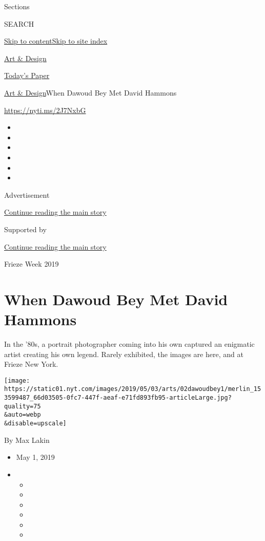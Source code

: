 Sections

SEARCH

\protect\hyperlink{site-content}{Skip to
content}\protect\hyperlink{site-index}{Skip to site index}

\href{https://www.nytimes.com/section/arts/design}{Art \& Design}

\href{https://myaccount.nytimes.com/auth/login?response_type=cookie\&client_id=vi}{}

\href{https://www.nytimes.com/section/todayspaper}{Today's Paper}

\href{/section/arts/design}{Art \& Design}\textbar{}When Dawoud Bey Met
David Hammons

\href{https://nyti.ms/2J7NxbG}{https://nyti.ms/2J7NxbG}

\begin{itemize}
\item
\item
\item
\item
\item
\item
\end{itemize}

Advertisement

\protect\hyperlink{after-top}{Continue reading the main story}

Supported by

\protect\hyperlink{after-sponsor}{Continue reading the main story}

Frieze Week 2019

\hypertarget{when-dawoud-bey-met-david-hammons}{%
\section{When Dawoud Bey Met David
Hammons}\label{when-dawoud-bey-met-david-hammons}}

In the '80s, a portrait photographer coming into his own captured an
enigmatic artist creating his own legend. Rarely exhibited, the images
are here, and at Frieze New York.

\texttt{[image: https://static01.nyt.com/images/2019/05/03/arts/02dawoudbey1/merlin\_153599487\_66d03505-0fc7-447f-aeaf-e71fd893fb95-articleLarge.jpg?quality=75\\\&auto=webp\\\&disable=upscale]}

By Max Lakin

\begin{itemize}
\item
  May 1, 2019
\item
  \begin{itemize}
  \item
  \item
  \item
  \item
  \item
  \item
  \end{itemize}
\end{itemize}

